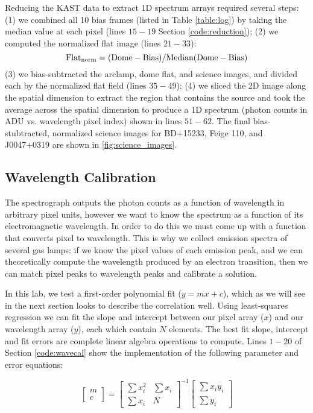 \documentclass[preprint]{aastex62}
\begin{document}
Reducing the KAST data to extract 1D spectrum arrays required several steps: (1) we combined all 10 bias frames (listed in Table \ref{table:log}) by taking the median value at each pixel (lines $15-19$ Section \ref{code:reduction}); (2) we computed the normalized flat image (lines $21-33$): 
\begin{equation}
    {\rm Flat_{norm} = (Dome - Bias)/Median(Dome - Bias)} 
\end{equation}
(3) we bias-subtracted the arclamp, dome flat, and science images, and divided each by the normalized flat field (lines $35-49$); (4) we sliced the 2D image along the spatial dimension to extract the region that contains the source and took the average across the spatial dimension to produce a 1D spectrum (photon counts in ADU vs. wavelength pixel index) shown in lines $51-62$. The final bias-stubtracted, normalized science images for BD+15233, Feige 110, and J0047+0319 are shown in \ref{fig:science_images}.


\subsection{Wavelength Calibration} \label{sec:wavecal}
The spectrograph outputs the photon counts as a function of wavelength in arbitrary pixel units, however we want to know the spectrum as a function of its electromagnetic wavelength. In order to do this we must come up with a function that converts pixel to wavelength. This is why we collect emission spectra of several gas lamps: if we know the pixel values of each emission peak, and we can theoretically compute the wavelength produced by an electron transition, then we can match pixel peaks to wavelength peaks and calibrate a solution.

In this lab, we test a first-order polynomial fit ($y=mx+c$), which as we will see in the next section looks to describe the correlation well. Using least-squares regression we can fit the slope and intercept between our pixel array ($x$) and our wavelength array ($y$), each which contain $N$ elements. The best fit slope, intercept and fit errors are complete linear algebra operations to compute. Lines $1-20$ of Section \ref{code:wavecal} show the implementation of the following parameter and error equations:

\begin{equation}
\begin{bmatrix}
    m \\ c
\end{bmatrix}
= 
\begin{bmatrix}
    \sum x_i^2 & \sum x_i \\
    \sum x_i & N
\end{bmatrix}^{-1}
\begin{bmatrix}
    \sum x_i y_i \\ \sum y_i
\end{bmatrix}
\end{equation}
\end{document}
